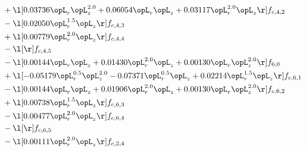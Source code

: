 \begin{alignat}{2}
& + \l[  0.03736 \opL_r \opL_z^{2.0} +  0.06054 \opL_r \opL_z +  0.03117 \opL_r^{2.0} \opL_z  \r] f_{c,4,2} \nonumber \\ 
& - \l[  0.02050 \opL_r^{1.5} \opL_z  \r] f_{c,4,3} \nonumber \\ 
& + \l[  0.00779 \opL_r^{2.0} \opL_z  \r] f_{c,4,4} \nonumber \\ 
& - \l[  \r] f_{c,4,5} \nonumber \\ 
& - \l[  0.00144 \opL_r \opL_z +  0.01430 \opL_r^{2.0} \opL_z +  0.00130 \opL_r \opL_z^{2.0}  \r] f_{6,0} \nonumber \\ 
& + \l[  -0.05179 \opL_r^{0.5} \opL_z^{2.0}   -0.07371 \opL_r^{0.5} \opL_z +  0.02214 \opL_r^{1.5} \opL_z  \r] f_{c,6,1} \nonumber \\ 
& - \l[  0.00144 \opL_r \opL_z +  0.01906 \opL_r^{2.0} \opL_z +  0.00130 \opL_r \opL_z^{2.0}  \r] f_{c,6,2} \nonumber \\ 
& + \l[  0.00738 \opL_r^{1.5} \opL_z  \r] f_{c,6,3} \nonumber \\ 
& - \l[  0.00477 \opL_r^{2.0} \opL_z  \r] f_{c,6,4} \nonumber \\ 
& - \l[  \r] f_{c,6,5} \nonumber \\ 
& - \l[  0.00111 \opL_r^{2.0} \opL_z  \r] f_{c,2,4} \nonumber \\ 
\end{alignat} 


